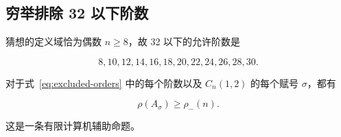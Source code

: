 \subsection{穷举排除 32 以下阶数}

猜想的定义域恰为偶数 \(n\geq 8\)，故 32 以下的允许阶数是

\begin{equation}
\label{eq:excluded-orders}
8,10,12,14,16,18,20,22,24,26,28,30.
\end{equation}

\begin{proposition}[有限排除]
\label{prop:finite-exclusion}
对于式~\eqref{eq:excluded-orders} 中的每个阶数以及 \(C_n(1,2)\) 的每个赋号
\(\sigma\)，都有

\begin{equation}
\label{eq:finite-exclusion-bound}
\rho(A_\sigma)\geq \rho_-(n).
\end{equation}

这是一条有限计算机辅助命题。

\end{proposition}
